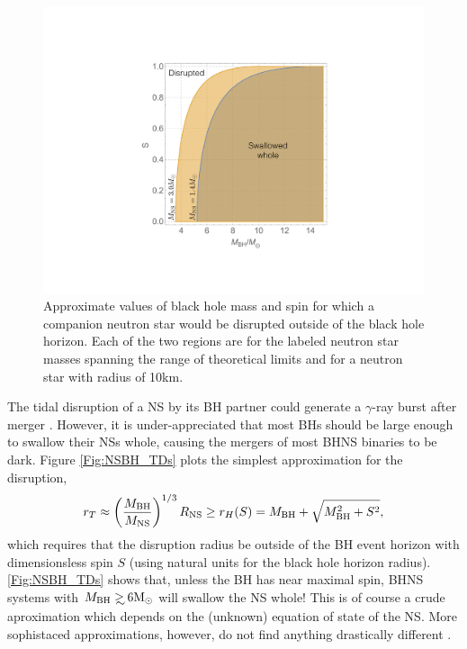 \begin{figure}
\begin{center}
\includegraphics[scale=0.33]{figures/ch0/BHNS_TDs} 
\end{center}
\caption{Approximate values of black hole mass and spin for which a companion neutron star would be disrupted outside of the black hole horizon. Each of the two regions are for the labeled neutron star masses spanning the range of theoretical limits and for a neutron star with radius of 10km.}
\label{Fig:Contour}
\end{figure}

The tidal disruption of a NS by its BH partner could generate a $\gamma$-ray
burst after merger \citep{NPP:NSBH_GRB:1992}. However, it is under-appreciated
that most BHs should be large enough to swallow their NSs
whole, causing the mergers of most BHNS binaries to be dark. Figure 
\ref{Fig:NSBH_TDs} plots the simplest approximation for the disruption,
\begin{equation}
 r_T \approx \left( \frac{M_{\rm{BH}} }{ M_{\rm{NS}}} \right)^{1/3} R_{\rm{NS}} \geq r_H(S) 
 = M_{\rm{BH}} + \sqrt{M^2_{\rm{BH}} + S^2},
\end{equation}
which requires that the disruption radius be outside of the BH event horizon
with dimensionsless spin $S$ (using natural units for the black hole horizon
radius). \ref{Fig:NSBH_TDs} shows that, unless the BH has near maximal spin,
BHNS systems with $M_{\rm{BH}} \gsim 6 \msun$ will swallow the NS whole! This
is of course a crude aproximation which depends on the (unknown) equation of
state of the NS. More sophistaced approximations, however, do not find anything
drastically different \citep[\emph{e.g.}][]{Foucart:2012}.


